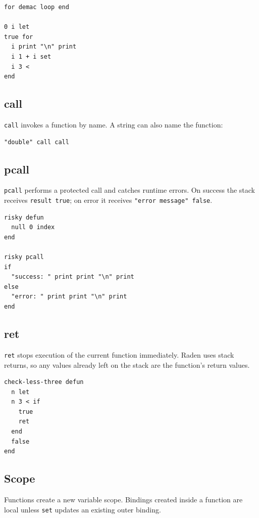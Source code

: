 \documentclass[11pt,a4paper]{article}
\newcommand{\code}[1]{\texttt{#1}}
\begin{document}
\begin{lstlisting}[language=Raden]
for demac loop end

0 i let
true for
  i print "\n" print
  i 1 + i set
  i 3 <
end
\end{lstlisting}

\subsection{call}

\code{call} invokes a function by name. A string can also name the
function:

\begin{lstlisting}[language=Raden]
"double" call call
\end{lstlisting}

\subsection{pcall}

\code{pcall} performs a protected call and catches runtime errors. On
success the stack receives \code{result true}; on error it receives
\code{"error message" false}.

\begin{lstlisting}[language=Raden]
risky defun
  null 0 index
end

risky pcall
if
  "success: " print print "\n" print
else
  "error: " print print "\n" print
end
\end{lstlisting}

\subsection{ret}

\code{ret} stops execution of the current function immediately. Raden
uses stack returns, so any values already left on the stack are the
function's return values.

\begin{lstlisting}[language=Raden]
check-less-three defun
  n let
  n 3 < if
    true
    ret
  end
  false
end
\end{lstlisting}

\subsection{Scope}

Functions create a new variable scope. Bindings created inside a function
are local unless \code{set} updates an existing outer binding.
\end{document}
